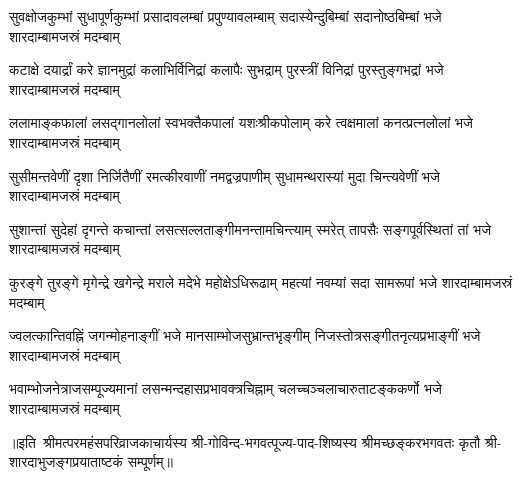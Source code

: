 

\fourlineindentedshloka
{सुवक्षोजकुम्भां सुधापूर्णकुम्भां}
{प्रसादावलम्बां प्रपुण्यावलम्बाम्}
{सदास्येन्दुबिम्बां सदानोष्ठबिम्बां}
{भजे शारदाम्बामजस्रं मदम्बाम्}

\fourlineindentedshloka
{कटाक्षे दयार्द्रां करे ज्ञानमुद्रां}
{कलाभिर्विनिद्रां कलापैः सुभद्राम्}
{पुरस्त्रीं विनिद्रां पुरस्तुङ्गभद्रां}
{भजे शारदाम्बामजस्रं मदम्बाम्}

\fourlineindentedshloka
{ललामाङ्कफालां लसद्गानलोलां}
{स्वभक्तैकपालां यशःश्रीकपोलाम्}
{करे त्वक्षमालां कनत्प्रत्नलोलां}
{भजे शारदाम्बामजस्रं मदम्बाम्}

\fourlineindentedshloka
{सुसीमन्तवेणीं दृशा निर्जितैणीं}
{रमत्कीरवाणीं नमद्वज्रपाणीम्}
{सुधामन्थरास्यां मुदा चिन्त्यवेणीं}
{भजे शारदाम्बामजस्रं मदम्बाम्}

\fourlineindentedshloka
{सुशान्तां सुदेहां दृगन्ते कचान्तां}
{लसत्सल्लताङ्गीमनन्तामचिन्त्याम्}
{स्मरेत् तापसैः सङ्गपूर्वस्थितां तां}
{भजे शारदाम्बामजस्रं मदम्बाम्}

\fourlineindentedshloka
{कुरङ्गे तुरङ्गे मृगेन्द्रे खगेन्द्रे}
{मराले मदेभे महोक्षेऽधिरूढाम्}
{महत्यां नवम्यां सदा सामरूपां}
{भजे शारदाम्बामजस्रं मदम्बाम्}

\fourlineindentedshloka
{ज्वलत्कान्तिवह्निं जगन्मोहनाङ्गीं}
{भजे मानसाम्भोजसुभ्रान्तभृङ्गीम्}
{निजस्तोत्रसङ्गीतनृत्यप्रभाङ्गीं}
{भजे शारदाम्बामजस्रं मदम्बाम्}

\fourlineindentedshloka
{भवाम्भोजनेत्राजसम्पूज्यमानां}
{लसन्मन्दहासप्रभावक्त्रचिह्नाम्}
{चलच्चञ्चलाचारुताटङ्ककर्णो}
{भजे शारदाम्बामजस्रं मदम्बाम्}

॥इति~श्रीमत्परमहंसपरिव्राजकाचार्यस्य श्री-गोविन्द-भगवत्पूज्य-पाद-शिष्यस्य
श्रीमच्छङ्करभगवतः कृतौ श्री-शारदाभुजङ्गप्रयाताष्टकं सम्पूर्णम्॥